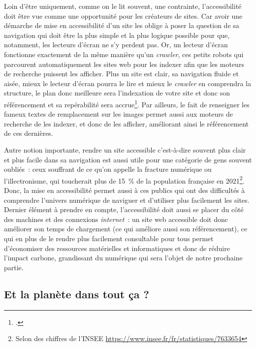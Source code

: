 Loin d’être uniquement, comme on le lit souvent, une contrainte, l’accessibilité doit être vue comme une opportunité pour les créateurs de sites. Car avoir une démarche de mise en accessibilité d’un site les oblige à poser la question de sa navigation qui doit être la plus simple et la plus logique possible pour que, notamment, les lecteurs d’écran ne s’y perdent pas. Or, un lecteur d’écran fonctionne exactement de la même manière qu’un \textit{crawler}, ces petits robots qui parcourent automatiquement les sites web pour les indexer afin que les moteurs de recherche puissent les afficher. Plus un site est clair, sa navigation fluide et aisée, mieux le lecteur d’écran pourra le lire et mieux le \textit{crawler} en comprendra la structure, le plan donc meilleure sera l’indexation de votre site et donc son référencement et sa repérabilité sera accrue\footcite{adminat_et_2023}. Par ailleurs, le fait de renseigner les fameux textes de remplacement sur les images permet aussi aux moteurs de recherche de les indexer, et donc de les afficher, améliorant ainsi le référencement de ces dernières.

Autre notion importante, rendre un site accessible c’est-à-dire souvent plus clair et plus facile dans sa navigation est aussi utile pour une catégorie de gens souvent oubliés : ceux souffrant de ce qu’on appelle la fracture numérique ou l’illectronisme, qui toucherait plus de 15 \% de la population française en 2021\footnote{Selon des chiffres de l'INSEE \url{https://www.insee.fr/fr/statistiques/7633654}}. Donc, la mise en accessibilité permet aussi à ces publics qui ont des difficultés à comprendre l’univers numérique de naviguer et d’utiliser plus facilement les sites. Dernier élément à prendre en compte, l’accessibilité doit aussi se placer du côté des machines et des connexions \textit{internet} : un site web accessible doit donc améliorer son temps de chargement (ce qui améliore aussi son référencement), ce qui en plus de le rendre plus facilement consultable pour tous permet d’économiser des ressources matérielles et informatiques et donc de réduire l’impact carbone, grandissant du numérique qui sera l’objet de notre prochaine partie.

\subsection{Et la planète dans tout ça ?}

